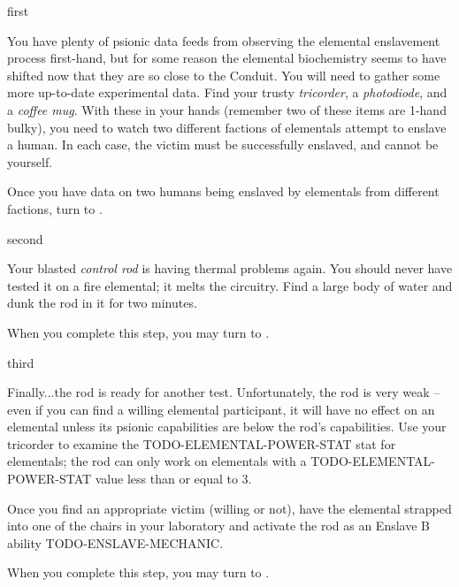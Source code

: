 \documentclass[notebook]{elementals}
\begin{document}

\startnotebook{\nEnslavementResearch{}}

\begin{page}{first}

You have plenty of psionic data feeds from observing the elemental enslavement process first-hand, but for some reason the elemental biochemistry seems to have shifted now that they are so close to the Conduit. You will need to gather some more up-to-date experimental data. Find your trusty \emph{tricorder}, a \emph{photodiode}, and a \emph{coffee mug}. With these in your hands (remember two of these items are 1-hand bulky), you need to watch two different factions of elementals attempt to enslave a human. In each case, the victim must be successfully enslaved, and cannot be yourself.

Once you have data on two humans being enslaved by elementals from different factions, turn to .

\end{page}

\begin{page}{second}

Your blasted \emph{control rod} is having thermal problems again. You should never have tested it on a fire elemental; it melts the circuitry. Find a large body of water and dunk the rod in it for two minutes.

When you complete this step, you may turn to .

\end{page}

\begin{page}{third}

Finally...the rod is ready for another test. Unfortunately, the rod is very weak -- even if you can find a willing elemental participant, it will have no effect on an elemental unless its psionic capabilities are below the rod's capabilities. Use your tricorder to examine the TODO-ELEMENTAL-POWER-STAT stat for elementals; the rod can only work on elementals with a TODO-ELEMENTAL-POWER-STAT value less than or equal to 3.

Once you find an appropriate victim (willing or not), have the elemental strapped into one of the chairs in your laboratory and activate the rod as an Enslave B ability TODO-ENSLAVE-MECHANIC.

When you complete this step, you may turn to .

\end{page}
\end{document}
